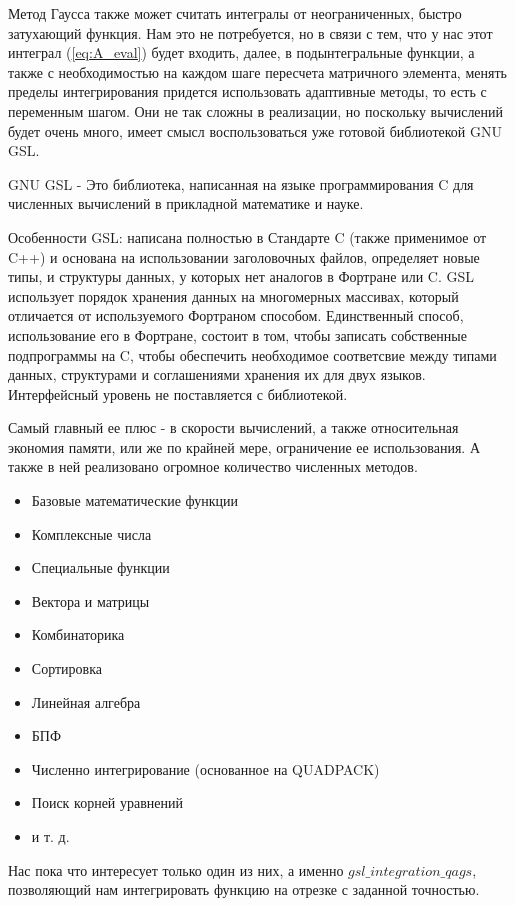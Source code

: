 \documentclass[14pt]{extarticle}
\begin{document}
Метод Гаусса также может считать интегралы от неограниченных, быстро затухающий функция. Нам это не потребуется, но в связи с тем, что у нас этот интеграл (\ref{eq:A_eval}) будет входить, далее, в подынтегральные функции, а также с необходимостью на каждом шаге пересчета матричного элемента, менять пределы интегрирования придется использовать адаптивные методы, то есть с переменным шагом. Они не так сложны в реализации, но поскольку вычислений будет очень много, имеет смысл воспользоваться уже готовой библиотекой GNU GSL. 

GNU GSL - Это библиотека, написанная на языке программирования C для численных вычислений в прикладной математике и науке.

Особенности GSL: написана полностью в Стандарте C (также применимое от C++) и основана на использовании заголовочных файлов, определяет новые типы, и структуры данных, у которых нет аналогов в Фортране или C. GSL использует порядок хранения данных на многомерных массивах, который отличается от используемого Фортраном способом. Единственный способ, использование его в Фортране, состоит в том, чтобы записать собственные подпрограммы на C, чтобы обеспечить необходимое соответсвие между типами данных, структурами и соглашениями хранения их для двух языков. Интерфейсный уровень не поставляется с библиотекой. 

Самый главный ее плюс - в скорости вычислений, а также относительная экономия памяти, или же по крайней мере, ограничение ее использования. А также в ней реализовано огромное количество численных методов.

\begin{itemize} 
	\item Базовые математические функции
	\item Комплексные числа
	\item Специальные функции
	\item Вектора и матрицы
	\item Комбинаторика
	\item Сортировка
	\item Линейная алгебра
	\item БПФ
	\item Численно интегрирование (основанное на QUADPACK)
	\item Поиск корней уравнений
	\item и т. д.
\end{itemize}

Нас пока что интересует только один из них, а именно $gsl\_integration\_qags$, позволяющий нам интегрировать функцию на отрезке с заданной точностью. 
\end{document}
